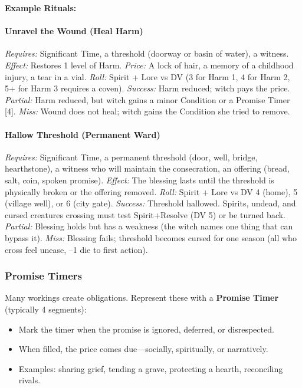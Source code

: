 \textbf{Example Rituals:}

\paragraph{Unravel the Wound (Heal Harm)}
\textit{Requires:} Significant Time, a threshold (doorway or basin of water), a witness.
\textit{Effect:} Restores 1 level of Harm.
\textit{Price:} A lock of hair, a memory of a childhood injury, a tear in a vial.
\textit{Roll:} Spirit + Lore vs DV (3 for Harm 1, 4 for Harm 2, 5+ for Harm 3 requires a coven).
\textit{Success:} Harm reduced; witch pays the price.
\textit{Partial:} Harm reduced, but witch gains a minor Condition or a Promise Timer [4].
\textit{Miss:} Wound does not heal; witch gains the Condition she tried to remove.

\paragraph{Hallow Threshold (Permanent Ward)}
\textit{Requires:} Significant Time, a permanent threshold (door, well, bridge, hearthstone), a witness who will maintain the consecration, an offering (bread, salt, coin, spoken promise).
\textit{Effect:} The blessing lasts until the threshold is physically broken or the offering removed.
\textit{Roll:} Spirit + Lore vs DV 4 (home), 5 (village well), or 6 (city gate).
\textit{Success:} Threshold hallowed. Spirits, undead, and cursed creatures crossing must test Spirit+Resolve (DV 5) or be turned back.
\textit{Partial:} Blessing holds but has a weakness (the witch names one thing that can bypass it).
\textit{Miss:} Blessing fails; threshold becomes cursed for one season (all who cross feel unease, --1 die to first action).

\subsubsection{Promise Timers}

Many workings create obligations. Represent these with a \textbf{Promise Timer} (typically 4 segments):

\begin{itemize}
  \item Mark the timer when the promise is ignored, deferred, or disrespected.
  \item When filled, the price comes due---socially, spiritually, or narratively.
  \item Examples: sharing grief, tending a grave, protecting a hearth, reconciling rivals.
\end{itemize}


